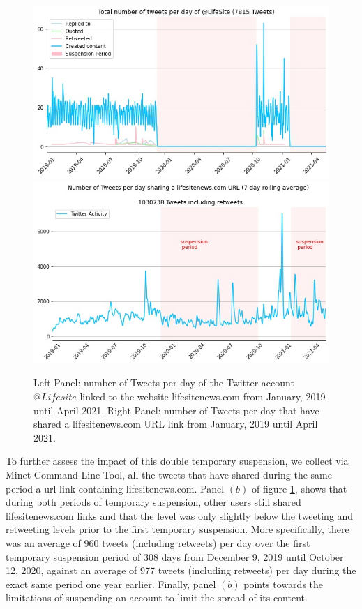 \documentclass{article}
\begin{document}
\begin{figure}[h]
\centering
		\includegraphics[scale=0.35]{./img/lifesite.jpg} 
		\includegraphics[scale=0.35]{./img/lifesite_rolling_7_lifesite.jpg}
\caption{Left Panel: number of Tweets per day of the Twitter account $@Lifesite$ linked to the website lifesitenews.com from January, 2019 until April 2021. Right Panel: number of Tweets per day that have shared a lifesitenews.com URL link from January, 2019 until April 2021. }
\label{fig2}
\end{figure}

To further assess the impact of this double temporary suspension, we collect via Minet Command Line Tool\cite{minet}, all the tweets that have shared during the same period a url link containing lifesitenews.com. Panel $(b)$ of figure \ref{fig2}, shows that during both periods of temporary suspension, other users still shared lifesitenews.com links and that the level was only slightly below the tweeting and retweeting levels prior to the first temporary suspension. More specifically, there was an average of 960 tweets (including retweets) per day over the first temporary suspension period of 308 days from December 9, 2019 until October 12, 2020, against an average of 977 tweets (including retweets) per day during the exact same period one year earlier. Finally, panel $(b)$ points towards the limitations of suspending an account to limit the spread of its content. 
\end{document}
